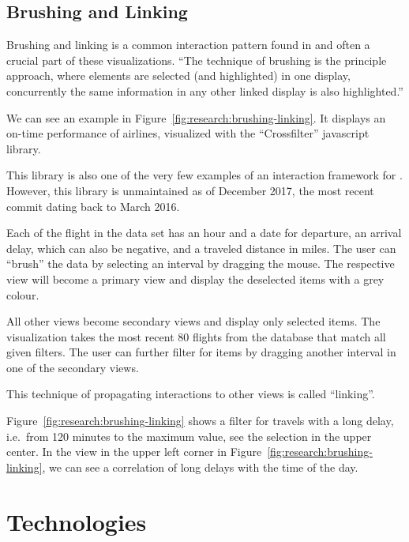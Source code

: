 \subsection{Brushing and Linking}
Brushing and linking is a common interaction pattern found in \cmvs{} and often a crucial part of these visualizations.
``The technique of brushing is the principle approach, where elements are selected (and highlighted) in one display, concurrently the same information in any other linked display is also highlighted.''\cite{Roberts2007}

We can see an example in Figure~\ref{fig:research:brushing-linking}.
It displays an on-time performance of airlines, visualized with the ``Crossfilter'' javascript library.

This library is also one of the very few examples of an interaction framework for \cmvs{}.
However, this library is unmaintained as of December 2017, the most recent commit dating back to March 2016.

Each of the flight in the data set has an hour and a date for departure, an arrival delay, which can also be negative, and a traveled distance in miles.
The user can ``brush'' the data by selecting an interval by dragging the mouse.
The respective view will become a primary view and display the deselected items with a grey colour.

All other views become secondary views and display only selected items.
The visualization takes the most recent 80 flights from the database that match all given filters.
The user can further filter for items by dragging another interval in one of the secondary views.

This technique of propagating interactions to other views is called ``linking''.

Figure~\ref{fig:research:brushing-linking} shows a filter for travels with a long delay, i.e.\ from 120 minutes to the maximum value, see the selection in the upper center.
In the view in the upper left corner in Figure~\ref{fig:research:brushing-linking}, we can see a correlation of long delays with the time of the day.

\section{Technologies}


